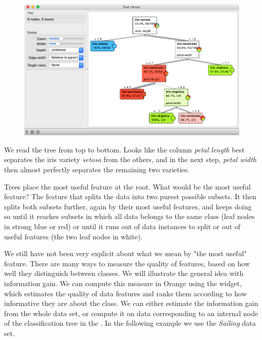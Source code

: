 \begin{figure}
    \includegraphics[scale=0.35]{tree-viewer.png}
    \label{fig:classification-predictions}
\end{figure}

We read the tree from top to bottom. Looks like the column \textit{petal length} best separates the iris variety \textit{setosa} from the others, and in the next step, \textit{petal width} then almost perfectly separates the remaining two varieties.

Trees place the most useful feature at the root. What would be the most useful feature? The feature that splits the data into two purest possible subsets. It then splits both subsets further, again by their most useful features, and keeps doing so until it reaches subsets in which all data belongs to the same class (leaf nodes in strong blue or red) or until it runs out of data instances to split or out of useful features (the two leaf nodes in white).

We still have not been very explicit about what we mean by "the most useful" feature. There are many ways to measure the quality of features, based on how well they distinguish between classes. We will illustrate the general idea with information gain. We can compute this measure in Orange using the  widget, which estimates the quality of data features and ranks them according to how informative they are about the class. We can either estimate the information gain from the whole data set, or compute it on data corresponding to an internal node of the classification tree in the . In the following example we use the \textit{Sailing} data set.

